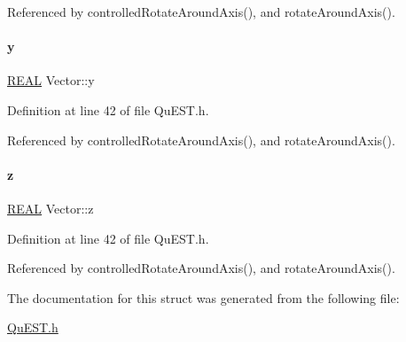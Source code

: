 Referenced by controlled\+Rotate\+Around\+Axis(), and rotate\+Around\+Axis().

\mbox{\label{structVector_a375ca805d4c808a53d7c4e0c737ae3de}} 
\paragraph{\texorpdfstring{y}{y}}
{\footnotesize\ttfamily \mbox{\hyperlink{QuEST__precision_8h_a4b654506f18b8bfd61ad2a29a7e38c25}{R\+E\+AL}} Vector\+::y}



Definition at line 42 of file Qu\+E\+S\+T.\+h.



Referenced by controlled\+Rotate\+Around\+Axis(), and rotate\+Around\+Axis().

\mbox{\label{structVector_ad4e863651be7d6b7e2b28cd7445a0ccf}} 
\paragraph{\texorpdfstring{z}{z}}
{\footnotesize\ttfamily \mbox{\hyperlink{QuEST__precision_8h_a4b654506f18b8bfd61ad2a29a7e38c25}{R\+E\+AL}} Vector\+::z}



Definition at line 42 of file Qu\+E\+S\+T.\+h.



Referenced by controlled\+Rotate\+Around\+Axis(), and rotate\+Around\+Axis().



The documentation for this struct was generated from the following file\+:\begin{DoxyCompactItemize}
\item 
\mbox{\hyperlink{QuEST_8h}{Qu\+E\+S\+T.\+h}}\end{DoxyCompactItemize}
